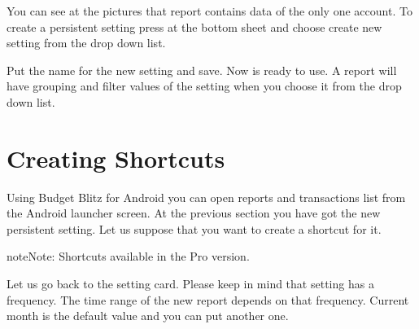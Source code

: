 \documentclass[a4paper,10pt,english]{sphinxmanual}
\begin{document}
\noindent{}

\noindent{}

\noindent{}

You can see at the pictures that report contains data of the only one account. To create
a persistent setting press  at the bottom sheet
and choose create new setting from the drop down list.

\noindent{}

\noindent{}

\noindent{}

Put the name  for the new setting and save. Now
 is ready to use. A report will have
grouping and filter values of the setting when you choose it from the
drop down list.

\noindent{}

\noindent{}


\section{Creating Shortcuts}
\label{\detokenize{shortcuts:creating-shortcuts}}
Using Budget Blitz for Android you can open reports and transactions list from the Android launcher screen. At the previous
section you have got the new persistent setting. Let us suppose that you want to create a shortcut for it.

\begin{sphinxadmonition}{note}{Note:}
Shortcuts available in the Pro version.
\end{sphinxadmonition}

Let us go back to the setting card. Please keep in mind that setting has a frequency. The time range of the
new report depends on that frequency. Current month is the default value and you can put another one.
\end{document}
